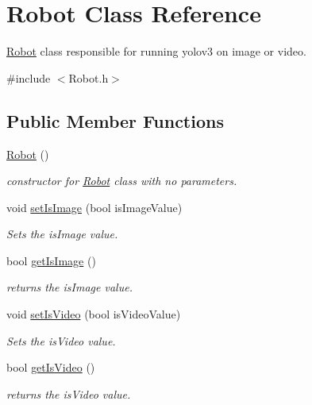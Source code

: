 \hypertarget{classRobot}{}\section{Robot Class Reference}
\label{classRobot}


\hyperlink{classRobot}{Robot} class responsible for running yolov3 on image or video.  




{\ttfamily \#include $<$Robot.\+h$>$}

\subsection*{Public Member Functions}
\begin{DoxyCompactItemize}
\item 
\hyperlink{classRobot_a4fc7c70ae20623f05e06f2ecb388b6c4}{Robot} ()
\begin{DoxyCompactList}\small\item\em constructor for \hyperlink{classRobot}{Robot} class with no parameters. \end{DoxyCompactList}\item 
void \hyperlink{classRobot_a781858a767a786b864c7f1fc78721524}{set\+Is\+Image} (bool is\+Image\+Value)
\begin{DoxyCompactList}\small\item\em Sets the is\+Image value. \end{DoxyCompactList}\item 
bool \hyperlink{classRobot_a554c0e1616b48ed356db58a7fa523215}{get\+Is\+Image} ()
\begin{DoxyCompactList}\small\item\em returns the is\+Image value. \end{DoxyCompactList}\item 
void \hyperlink{classRobot_ad92bd0b6855a8579c7e230ddaddbc598}{set\+Is\+Video} (bool is\+Video\+Value)
\begin{DoxyCompactList}\small\item\em Sets the is\+Video value. \end{DoxyCompactList}\item 
bool \hyperlink{classRobot_a4a37b5e8cb83c89c7e2c180ca9937b17}{get\+Is\+Video} ()
\begin{DoxyCompactList}\small\item\em returns the is\+Video value. \end{DoxyCompactList}\item 

\end{DoxyCompactItemize}
